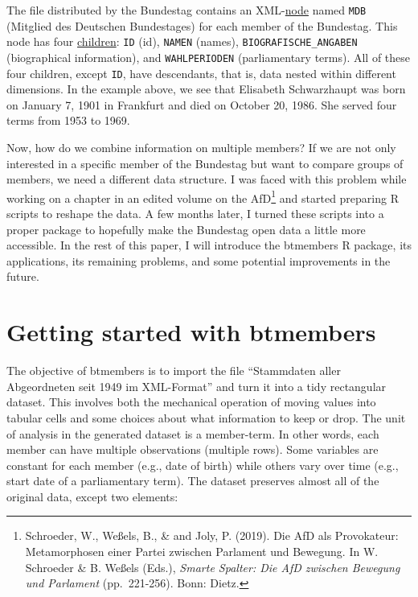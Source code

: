 \documentclass[12pt]{article}
\begin{document}
The file distributed by the Bundestag contains an
XML-\href{https://en.wikipedia.org/wiki/Node_(computer_science)}{node}
named \texttt{MDB} (Mitglied des Deutschen Bundestages) for each member
of the Bundestag. This node has four
\href{https://en.wikipedia.org/wiki/Tree_(data_structure)}{children}:
\texttt{ID} (id), \texttt{NAMEN} (names), \texttt{BIOGRAFISCHE\_ANGABEN}
(biographical information), and \texttt{WAHLPERIODEN} (parliamentary
terms). All of these four children, except \texttt{ID}, have
descendants, that is, data nested within different dimensions. In the
example above, we see that Elisabeth Schwarzhaupt was born on January 7,
1901 in Frankfurt and died on October 20, 1986. She served four terms
from 1953 to 1969.

Now, how do we combine information on multiple members? If we are not
only interested in a specific member of the Bundestag but want to
compare groups of members, we need a different data structure. I was
faced with this problem while working on a chapter in an edited volume
on the AfD\footnote{Schroeder, W., Weßels, B., \& and Joly, P. (2019).
  Die AfD als Provokateur: Metamorphosen einer Partei zwischen Parlament
  und Bewegung. In W. Schroeder \& B. Weßels (Eds.), \emph{Smarte
  Spalter: Die AfD zwischen Bewegung und Parlament} (pp.~221-256). Bonn:
  Dietz.} and started preparing R scripts to reshape the data. A few
months later, I turned these scripts into a proper package to hopefully
make the Bundestag open data a little more accessible. In the rest of
this paper, I will introduce the btmembers R package, its applications,
its remaining problems, and some potential improvements in the future.

\hypertarget{getting-started-with-btmembers}{%
\section{Getting started with
btmembers}\label{getting-started-with-btmembers}}

The objective of btmembers is to import the file ``Stammdaten aller
Abgeordneten seit 1949 im XML-Format'' and turn it into a tidy
rectangular dataset. This involves both the mechanical operation of
moving values into tabular cells and some choices about what information
to keep or drop. The unit of analysis in the generated dataset is a
member-term. In other words, each member can have multiple observations
(multiple rows). Some variables are constant for each member (e.g., date
of birth) while others vary over time (e.g., start date of a
parliamentary term). The dataset preserves almost all of the original
data, except two elements:
\end{document}
